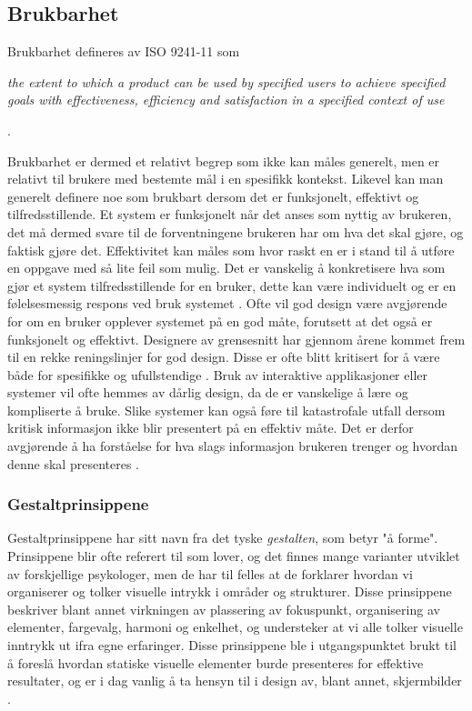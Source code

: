 \subsection{Brukbarhet}
\label{chp: brukbarhet}

Brukbarhet defineres av ISO 9241-11 som

\noindent
\begin{otherlanguage}{english}
\emph{the extent to which a product can be used by specified users to achieve specified goals with effectiveness, efficiency and satisfaction in a specified context of use}
\end{otherlanguage}
 \cite{Svanes08}.

\noindent
Brukbarhet er dermed et relativt begrep som ikke kan måles generelt, men er relativt til brukere med bestemte mål i en spesifikk kontekst. Likevel kan man generelt definere noe som brukbart dersom det er funksjonelt, effektivt og tilfredsstillende.
Et system er funksjonelt når det anses som nyttig av brukeren, det må dermed svare til de forventningene brukeren har om hva det skal gjøre, og faktisk gjøre det. Effektivitet kan måles som hvor raskt en er i stand til å utføre en oppgave med så lite feil som mulig. Det er vanskelig å konkretisere hva som gjør et system tilfredsstillende for en bruker, dette kan være individuelt og er en følelsesmessig respons ved bruk systemet \cite{Kuniavsky}. Ofte vil god design være avgjørende for om en bruker opplever systemet på en god måte, forutsett at det også er funksjonelt og effektivt. Designere av grensesnitt har gjennom årene kommet frem til en rekke reningslinjer for god design. Disse er ofte blitt kritisert for å være både for spesifikke og ufullstendige \cite{mmi}. 
Bruk av interaktive applikasjoner eller systemer vil ofte hemmes av dårlig design, da de er vanskelige å lære og kompliserte å bruke. Slike systemer kan også føre til katastrofale utfall dersom kritisk informasjon ikke blir presentert på en effektiv måte. Det er derfor avgjørende å ha forståelse for hva slags informasjon brukeren trenger og hvordan denne skal presenteres \cite{Ebright10}. 

\noindent
\subsubsection{Gestaltprinsippene}
Gestaltprinsippene har sitt navn fra det tyske \emph{gestalten}, som betyr "å forme". Prinsippene blir ofte referert til som lover, og det finnes mange varianter utviklet av forskjellige psykologer, men de har til felles at de forklarer hvordan vi organiserer og tolker visuelle intrykk i områder og strukturer. Disse prinsippene beskriver blant annet virkningen av plassering av fokuspunkt, organisering av elementer, fargevalg, harmoni og enkelhet, og understeker at vi alle tolker visuelle inntrykk ut ifra egne erfaringer. 
Disse prinsippene ble i utgangspunktet brukt til å foreslå hvordan statiske visuelle elementer burde presenteres for effektive resultater\cite{Chang02}, og er i dag vanlig å ta hensyn til i design av, blant annet, skjermbilder \cite{Chang02}. 

